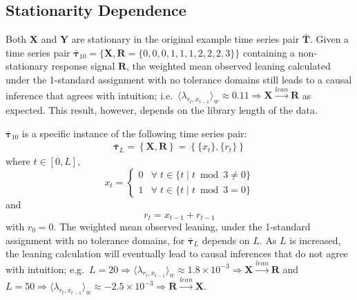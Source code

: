 \documentclass[a4paper,11pt,twocolumn]{article}
\begin{document}
\subsection{Stationarity Dependence}
Both $\mathbf{X}$ and $\mathbf{Y}$ are stationary in the original example time series pair $\bar{\mathbf{T}}$.  Given a time series pair $\bar{\mathbf{\tau}}_{10} = \{\mathbf{X},\mathbf{R} = \{0,0,0,1,1,1,2,2,2,3\}\}$ containing a non-stationary response signal $\mathbf{R}$, the weighted mean observed leaning calculated under the 1-standard assignment with no tolerance domains still leads to a causal inference that agrees with intuition; i.e.\ $\langle \lambda_{r_t,x_{t-1}} \rangle_w \approx 0.11 \Rightarrow \mathbf{X}\xrightarrow{lean}\mathbf{R}$ as expected.  This result, however, depends on the library length of the data.

$\bar{\mathbf{\tau}}_{10}$ is a specific instance of the following time series pair:
\begin{eqnarray}
\bar{\mathbf{\tau}}_L = \left\{\mathbf{X},\mathbf{R}\right\} = \left\{\{x_t\},\{r_t\}\right\}
\end{eqnarray}
where $t\in[0,L]$,
\begin{equation}
x_t = \left\{
  \begin{array}{lr}
    0 & \forall\; t\in\{t\;|\;t\bmod 3 \neq 0\}\\
    1 & \forall\; t\in\{t\;|\;t\bmod 3 = 0\}
  \end{array}
\right.
\end{equation}
and
\begin{equation}
r_t = x_{t-1}+r_{t-1}
\end{equation}
with $r_0 = 0$.  The weighted mean observed leaning, under the 1-standard assignment with no tolerance domains, for $\bar{\mathbf{\tau}}_L$ depends on $L$.  As $L$ is increased, the leaning calculation will eventually lead to causal inferences that do not agree with intuition; e.g.\ $L = 20 \Rightarrow \langle \lambda_{r_t,x_{t-1}} \rangle_w \approx 1.8\times10^{-3} \Rightarrow \mathbf{X}\xrightarrow{lean}\mathbf{R}$ and $L = 50 \Rightarrow \langle \lambda_{r_t,x_{t-1}} \rangle_w \approx -2.5\times10^{-3} \Rightarrow \mathbf{R}\xrightarrow{lean}\mathbf{X}$.  
\end{document}
